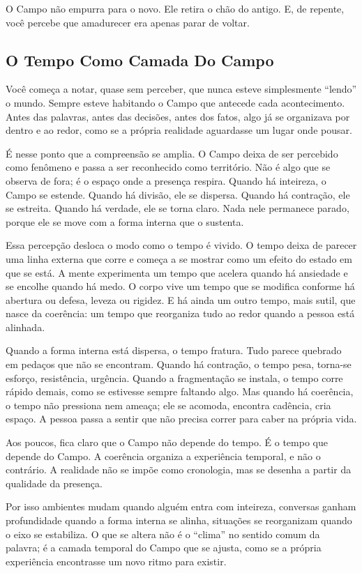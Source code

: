 \documentclass[12pt]{book}
\begin{document}
O Campo não empurra para o novo. Ele retira o chão do antigo. E, de repente, você percebe que amadurecer era apenas parar de voltar.

\subsection*{O Tempo Como Camada Do Campo}

Você começa a notar, quase sem perceber, que nunca esteve simplesmente ``lendo'' o mundo. Sempre esteve habitando o Campo que antecede cada acontecimento. Antes das palavras, antes das decisões, antes dos fatos, algo já se organizava por dentro e ao redor, como se a própria realidade aguardasse um lugar onde pousar.

É nesse ponto que a compreensão se amplia. O Campo deixa de ser percebido como fenômeno e passa a ser reconhecido como território. Não é algo que se observa de fora; é o espaço onde a presença respira. Quando há inteireza, o Campo se estende. Quando há divisão, ele se dispersa. Quando há contração, ele se estreita. Quando há verdade, ele se torna claro. Nada nele permanece parado, porque ele se move com a forma interna que o sustenta.

Essa percepção desloca o modo como o tempo é vivido. O tempo deixa de parecer uma linha externa que corre e começa a se mostrar como um efeito do estado em que se está. A mente experimenta um tempo que acelera quando há ansiedade e se encolhe quando há medo. O corpo vive um tempo que se modifica conforme há abertura ou defesa, leveza ou rigidez. E há ainda um outro tempo, mais sutil, que nasce da coerência: um tempo que reorganiza tudo ao redor quando a pessoa está alinhada.

Quando a forma interna está dispersa, o tempo fratura. Tudo parece quebrado em pedaços que não se encontram. Quando há contração, o tempo pesa, torna-se esforço, resistência, urgência. Quando a fragmentação se instala, o tempo corre rápido demais, como se estivesse sempre faltando algo. Mas quando há coerência, o tempo não pressiona nem ameaça; ele se acomoda, encontra cadência, cria espaço. A pessoa passa a sentir que não precisa correr para caber na própria vida.

Aos poucos, fica claro que o Campo não depende do tempo. É o tempo que depende do Campo. A coerência organiza a experiência temporal, e não o contrário. A realidade não se impõe como cronologia, mas se desenha a partir da qualidade da presença.

Por isso ambientes mudam quando alguém entra com inteireza, conversas ganham profundidade quando a forma interna se alinha, situações se reorganizam quando o eixo se estabiliza. O que se altera não é o ``clima'' no sentido comum da palavra; é a camada temporal do Campo que se ajusta, como se a própria experiência encontrasse um novo ritmo para existir.
\end{document}
